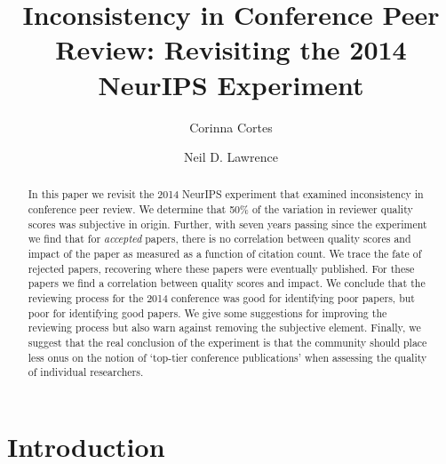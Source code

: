 \documentclass[twoside]{article}
\title{Inconsistency in Conference Peer Review: Revisiting the 2014 NeurIPS Experiment}
\author[$\star$]{Corinna Cortes}
\author[$\dagger$]{Neil D. Lawrence}
\affil[$\star$]{Google Research, New York}
\affil[$\dagger$]{Computer Lab, University of Cambridge}
\begin{document}
\maketitle

%

%

%

\begin{abstract}
    In this paper we revisit the 2014 NeurIPS experiment that examined
inconsistency in conference peer review. We determine that 50\% of the variation
in reviewer quality scores was subjective in origin. Further, with seven years
passing since the experiment we find that for \emph{accepted} papers,
there is no correlation between quality scores and impact of the paper
as measured as a function of citation count. We trace the fate of
rejected papers, recovering where these papers were eventually
published. For these papers we find a correlation between quality scores
and impact. We conclude that the reviewing process for the 2014
conference was good for identifying poor papers, but poor for
identifying good papers. We give some suggestions for improving the
reviewing process but also warn against removing the subjective element.
Finally, we suggest that the real conclusion of the experiment is that
the community should place less onus on the notion of `top-tier
conference publications' when assessing the quality of individual
researchers. 
\end{abstract}

\hypertarget{introduction}{%
\section{Introduction}\label{introduction}}
\end{document}
